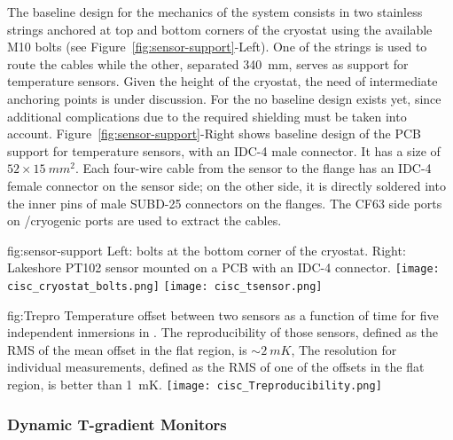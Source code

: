 The baseline design for the mechanics of the \single system consists in two stainless strings anchored at top and bottom corners of the cryostat
using the available M10 bolts (see Figure~\ref{fig:sensor-support}-Left). One of the strings is used to route the cables while the other,
separated \SI{340}{mm}, serves as support for temperature sensors.
Given the height of the cryostat, the need of intermediate anchoring points is under discussion. For the  no baseline design exists yet,
since additional complications due to the required \efield shielding must be taken into account. Figure~\ref{fig:sensor-support}-Right shows baseline design of the
PCB support for temperature sensors, with an IDC-4 male connector. It has a size of $52\times \SI{15}{mm^2}$. Each four-wire cable from the sensor to the flange has an IDC-4 female connector
on the sensor side; on the other side, it is directly soldered into the inner pins of male SUBD-25 connectors on the flanges. The CF63 side ports on /cryogenic ports are 
used to extract the cables. 

\begin{dunefigure}{fig:sensor-support}
  {Left: bolts at the bottom corner of the cryostat. Right: Lakeshore PT102 sensor mounted on a PCB with an IDC-4 connector.}
  \texttt{[image: cisc\_cryostat\_bolts.png]}%
    \hspace{1cm}%
  \texttt{[image: cisc\_tsensor.png]}%
\end{dunefigure}


\begin{dunefigure}{fig:Trepro}
  {Temperature offset between two sensors as a function of time for five independent inmersions in \lar. The reproducibility of those sensors,
    defined as the RMS of the mean offset in the flat region, is $\sim \SI{2}{mK}$,
    The resolution for individual measurements, defined as the RMS of one of the offsets in the flat region, is better than \SI{1}{mK}.}
  \texttt{[image: cisc\_Treproducibility.png]}%
\end{dunefigure}


\subsubsection{Dynamic T-gradient Monitors}

